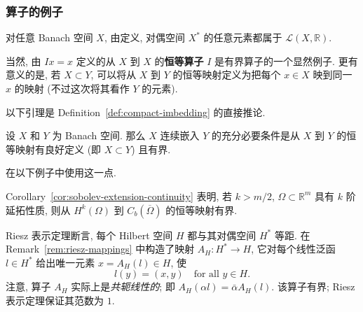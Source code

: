 \subsubsection{算子的例子}\label{subsec:operator-examples}

\begin{Example}
\label{ex:dual-functional-bounded-operator}
对任意 Banach 空间 $X$, 由定义, 对偶空间 $X^*$ 的任意元素都属于 $\mathcal{L}(X,\mathbb{R})$.
\end{Example}

\begin{Example}
\label{ex:identity-operator-and-inclusion}
当然, 由 $Ix=x$ 定义的从 $X$ 到 $X$ 的\textbf{恒等算子} $I$ 是有界算子的一个显然例子. 更有意义的是, 若 $X\subset Y$, 可以将从 $X$ 到 $Y$ 的恒等映射定义为把每个 $x\in X$ 映到同一 $x$ 的映射 (不过这次将其看作 $Y$ 的元素).
\end{Example}

以下引理是 Definition~\ref{def:compact-imbedding} 的直接推论.

\begin{Lemma}
\label{lem:identity-bounded-continuous-embedding}
设 $X$ 和 $Y$ 为 Banach 空间. 那么 $X$ 连续嵌入 $Y$ 的充分必要条件是从 $X$ 到 $Y$ 的恒等映射有良好定义 (即 $X\subset Y$) 且有界.
\end{Lemma}

在以下例子中使用这一点.

\begin{Example}
\label{ex:sobolev-identity-inclusion-bounded}
Corollary~\ref{cor:sobolev-extension-continuity} 表明, 若 $k>m/2$, $\Omega\subset\mathbb{R}^m$ 具有 $k$ 阶延拓性质, 则从 $H^k(\Omega)$ 到 $C_b(\overline\Omega)$ 的恒等映射有界.
\end{Example}

\begin{Example}
\label{ex:riesz-map-conjugate-linear-operator}
Riesz 表示定理断言, 每个 Hilbert 空间 $H$ 都与其对偶空间 $H^*$ 等距. 在 Remark~\ref{rem:riesz-mappings} 中构造了映射 $A_H:H^*\to H$, 它对每个线性泛函 $l\in H^*$ 给出唯一元素 $x=A_H(l)\in H$, 使\[l(y)=(x,y)\quad\text{for all }y\in H.\]注意, 算子 $A_H$ 实际上是\emph{共轭线性的}; 即 $A_H(\alpha l)=\bar\alpha A_H(l)$. 该算子有界; Riesz 表示定理保证其范数为 $1$.
\end{Example}

